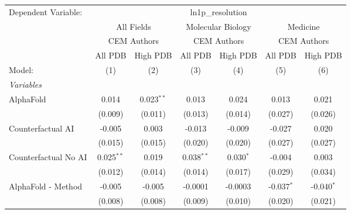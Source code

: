 \begingroup
\centering
\begin{tabular}{lcccccc}
   \tabularnewline \midrule \midrule
   Dependent Variable: & \multicolumn{6}{c}{ln1p\_resolution}\\
 & \multicolumn{2}{c}{All Fields} & \multicolumn{2}{c}{Molecular Biology} & \multicolumn{2}{c}{Medicine} \\
\cmidrule(lr){2-3} \cmidrule(lr){4-5} \cmidrule(lr){6-7}
 & \multicolumn{2}{c}{CEM Authors} & \multicolumn{2}{c}{CEM Authors} & \multicolumn{2}{c}{CEM Authors} \\
\cmidrule(lr){2-3} \cmidrule(lr){4-5} \cmidrule(lr){6-7}
 & \multicolumn{1}{c}{All PDB} & \multicolumn{1}{c}{High PDB} & \multicolumn{1}{c}{All PDB} & \multicolumn{1}{c}{High PDB} & \multicolumn{1}{c}{All PDB} & \multicolumn{1}{c}{High PDB} \\
\cmidrule(lr){2-2} \cmidrule(lr){3-3} \cmidrule(lr){4-4} \cmidrule(lr){5-5} \cmidrule(lr){6-6} \cmidrule(lr){7-7}
   Model:                                                     & (1)          & (2)           & (3)          & (4)         & (5)          & (6)\\  
   \midrule
   \emph{Variables}\\
   AlphaFold                                                  & 0.014        & 0.023$^{**}$  & 0.013        & 0.024       & 0.013        & 0.021\\   
                                                              & (0.009)      & (0.011)       & (0.013)      & (0.014)     & (0.027)      & (0.026)\\   
   Counterfactual AI                                          & -0.005       & 0.003         & -0.013       & -0.009      & -0.027       & 0.020\\   
                                                              & (0.015)      & (0.015)       & (0.020)      & (0.020)     & (0.027)      & (0.027)\\   
   Counterfactual No AI                                       & 0.025$^{**}$ & 0.019         & 0.038$^{**}$ & 0.030$^{*}$ & -0.004       & 0.003\\   
                                                              & (0.012)      & (0.014)       & (0.014)      & (0.017)     & (0.029)      & (0.034)\\   
   AlphaFold - Method                                         & -0.005       & -0.005        & -0.0001      & -0.0003     & -0.037$^{*}$ & -0.040$^{*}$\\   
                                                              & (0.008)      & (0.008)       & (0.009)      & (0.010)     & (0.020)      & (0.021)\\   

\end{tabular}
